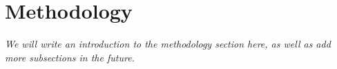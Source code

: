 \section{Methodology}\label{sec:methodology}
\textit{We will write an introduction to the methodology section here, as well as add more subsections in the future.}



